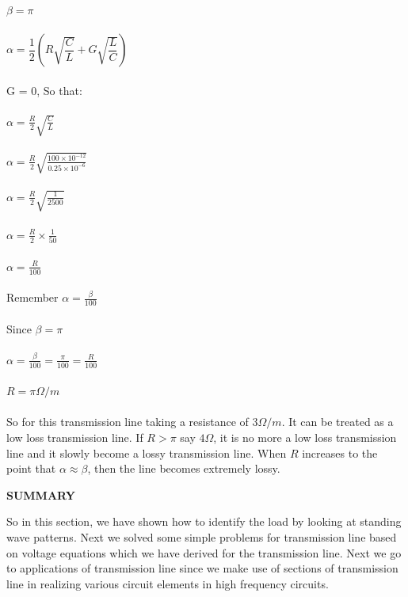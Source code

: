${\beta=\pi}$\\\\			${\alpha={\dfrac{1}{2}}(R\sqrt{\dfrac{C}{L}}+G\sqrt{\dfrac{L}{C}})}$\\\\
G = 0, So that:\\\\
${\alpha={\frac{R}{2}}\sqrt{\frac{C}{L}}}$\\\\
${\alpha=\frac{R}{2}\sqrt{\frac{100\times10^{-12}}{0.25\times10^{-6}}}}$\\\\
${\alpha=\frac{R}{2}\sqrt{\frac{1}{2500}}}$\\\\
${\alpha=\frac{R}{2}\times\frac{1}{50}}$\\\\
${\alpha=\frac{R}{100}}$\\\\
Remember 
${\alpha = \frac{\beta}{100}}$\\\\
Since ${\beta = \pi}$\\\\
${\alpha = \frac{\beta}{100} = \frac{\pi}{100} = \frac{R}{100}}$\\\\
${R = \pi\Omega/m}$\\\\ 
So for this transmission line taking a resistance of ${3\Omega /m}$. It can be treated as a low loss transmission line. If ${R>\pi}$ say ${4\Omega}$, it is no more a low loss transmission line and it slowly become a lossy transmission line. When ${R}$ increases to the point that ${\alpha\approx\beta}$, then the line becomes extremely lossy.\newpage

\begin{center}
\textbf{SUMMARY}
\end{center}
So in this section, we have shown how to identify the load by looking at standing wave patterns. Next we solved some simple problems for transmission line based on voltage equations which we have derived for the transmission line. Next we go to applications of transmission line since we make use of sections of transmission line in realizing various circuit elements in high frequency circuits.\\		
